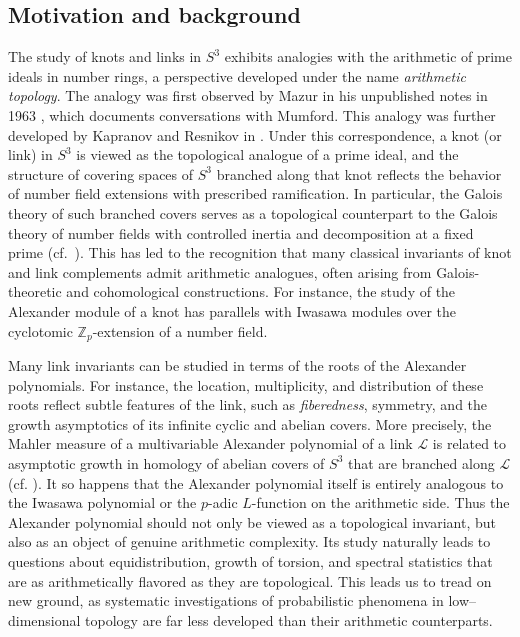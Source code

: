 \documentclass[table]{amsart}
\newcommand{\cL}{\mathcal{L}}
\numberwithin{equation}{section}
\begin{document}
\subsection{Motivation and background}
\par The study of knots and links in $S^3$ exhibits analogies with the arithmetic of prime ideals in number rings, a perspective developed under the name \emph{arithmetic topology}. The analogy was first observed by Mazur in his unpublished notes in 1963 \cite{mazur1963remarks}, which documents conversations with Mumford. This analogy was further developed by Kapranov \cite{kapranov1996analogies} and Resnikov in \cite{Reznikov1,Reznikov2}. Under this correspondence, a knot (or link) in $S^{3}$ is viewed as the topological analogue of a prime ideal, and the structure of covering spaces of $S^{3}$ branched along that knot reflects the behavior of number field extensions with prescribed ramification. In particular, the Galois theory of such branched covers serves as a topological counterpart to the Galois theory of number fields with controlled inertia and decomposition at a fixed prime (cf.\ \cite{morishita2011knots}). This has led to the recognition that many classical invariants of knot and link complements admit arithmetic analogues, often arising from Galois-theoretic and cohomological constructions. For instance, the study of the Alexander module of a knot has parallels with Iwasawa modules over the cyclotomic $\mathbb{Z}_p$-extension of a number field.

\par Many link invariants can be studied in terms of the roots of the Alexander polynomials. For instance, the location, multiplicity, and distribution of these roots reflect subtle features of the link, such as \emph{fiberedness}, symmetry, and the growth asymptotics of its infinite cyclic and abelian covers. More precisely, the Mahler measure of a multivariable Alexander polynomial of a link $\cL$ is related to asymptotic growth in homology of abelian covers of $S^3$ that are branched along $\mathcal{L}$ (cf. \cite{SW1, SW2}). It so happens that the Alexander polynomial itself is entirely analogous to the Iwasawa polynomial or the $p$-adic $L$-function on the arithmetic side. Thus the Alexander polynomial should not only be viewed as a topological invariant, but also as an object of genuine arithmetic complexity. Its study naturally leads to questions about equidistribution, growth of torsion, and spectral statistics that are as arithmetically flavored as they are topological. This leads us to tread on new ground, as systematic investigations of probabilistic phenomena in low–dimensional topology are far less developed than their arithmetic counterparts. 
\end{document}
